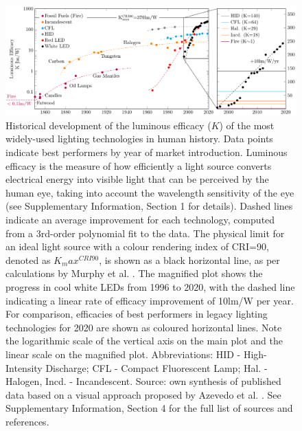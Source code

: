 \documentclass[parskip=full]{article}
\begin{document}
\begin{figure}[h!]
 \centering
 \includegraphics[width=\textwidth]{figures/history_efficacy.pdf}
 \caption{Historical development of the luminous efficacy ($K$) of the most widely-used lighting technologies in human history. Data points indicate best performers by year of market introduction. Luminous efficacy is the measure of how efficiently a light source converts electrical energy into visible light that can be perceived by the human eye, taking into account the wavelength sensitivity of the eye (see Supplementary Information, Section 1 for details). Dashed lines indicate an average improvement for each technology, computed from a 3rd-order polynomial fit to the data. The physical limit for an ideal light source with a colour rendering index of CRI=90, denoted as $K_max^{CRI90}$, is shown as a black horizontal line, as per calculations by Murphy et al. \cite{Murphy2012}. The magnified plot shows the progress in cool white LEDs from 1996 to 2020, with the dashed line indicating a linear rate of efficacy improvement of 10lm/W per year. For comparison, efficacies of best performers in legacy lighting technologies for 2020 are shown as coloured horizontal lines. Note the logarithmic scale of the vertical axis on the main plot and the linear scale on the magnified plot. Abbreviations: HID - High-Intensity Discharge; CFL - Compact Fluorescent Lamp; Hal. - Halogen, Incd. - Incandescent. Source: own synthesis of published data based on a visual approach proposed by Azevedo et al. \cite{azevedo2009transition}. See Supplementary Information, Section 4 for the full list of sources and references.}
 \label{fgr:history_efficacy}
\end{figure}
\end{document}
